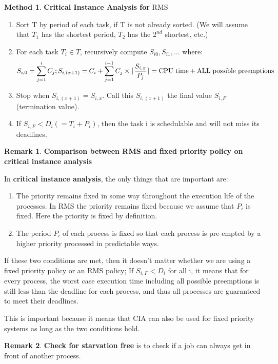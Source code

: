 \documentclass[12pt,a4paper]{article}
\theoremstyle{definition}
\newtheorem*{remark}{Remark}
\newtheorem{method}{Method}[section]
\DeclarePairedDelimiter\ceil{\lceil}{\rceil}
\newenvironment{myenumerate}
{ \begin{enumerate}
    \setlength{\itemsep}{5pt}
    \setlength{\parskip}{0pt}
    \setlength{\parsep}{0pt}     }
{ \end{enumerate}                }
\begin{document}
\begin{method}{\textbf{Critical Instance Analysis for} \textsf{RMS}}
	\begin{myenumerate}
		\item Sort T by period of each task, if T is not already sorted. (We will assume that $T_1$ has the shortest period, $T_2$ has the $2^{nd}$ shortest, etc.)
		\item For each task $T_i \in T$, recursively compute $S_{i0}, S_{i1}, \dots$ where:
		\[ S_{i,0}=\sum^i_{j=1}C_j; S_{i,(x+1)}=C_i+\sum^{i-1}_{j=1}C_j\times \ceil{\frac{S_{i,x}}{P_j}} =\text{CPU time}+\text{ALL possible preemptions} \]
		\item Stop when $S_{i,(x+1)}=S_{i,x}$. Call this $S_{i,(x+1)}$ the final value $S_{i,F}$ (termination value).
		\item If $S_{i,F}<D_i (=T_i+P_i)$, then the task i is schedulable and will not miss its deadlines.
	\end{myenumerate}
\end{method}
\begin{remark}{\textbf{Comparison between RMS and fixed priority policy on critical instance analysis}}

	In \textbf{critical instance analysis}, the only things that are important are:
	\begin{myenumerate}
		\item The priority remains fixed in some way throughout the execution life of the processes. In RMS the priority remains fixed because we assume that $P_i$ is fixed. Here the priority is fixed by definition.
		\item The period $P_i$ of each process is fixed so that each process is pre-empted by a higher priority processed in predictable ways.
	\end{myenumerate}
	
	If these two conditions are met, then it doesn’t matter whether we are using a fixed priority policy or an RMS policy; If $S_{i, F} < D_i$ for all i, it means that for every process, the worst case execution time including all possible preemptions is still less than the deadline for each process, and thus all processes are guaranteed to meet their deadlines.
	
	This is important because it means that CIA can also be used for fixed priority systems as long as the two conditions hold.
\end{remark}

\begin{remark}{\textbf{Check for starvation free}}
	is to check if a job can always get in front of another process.
\end{remark}
\end{document}
